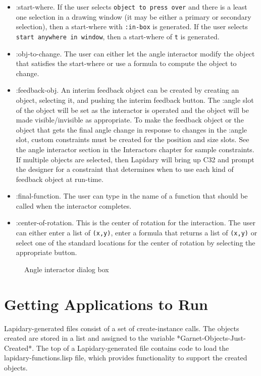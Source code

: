 \begin{itemize}
\item :start-where. If the user selects {\tt object to press over}
and there is a least one selection in a drawing
window (it may be either a primary or secondary selection), then a start-where
with {\tt :in-box} is generated. If the user selects {\tt start anywhere in
window}, then a start-where of {\tt t} is generated.

\item :obj-to-change. The user can either let the angle interactor modify the
object that satisfies the start-where or use a formula to compute the
object to change.

\item :feedback-obj. An interim feedback object can be created by creating
an object, selecting it,
and pushing the interim feedback button.
The :angle slot of the object will be
set as the interactor is operated and the object will be made visible/invisible
as appropriate.  To make the feedback object or the object that gets the final
angle change in response to changes in the :angle slot, custom constraints
must be created for the position and size slots.  See the angle interactor
section in the Interactors chapter for sample constraints.
If multiple objects are selected, then
Lapidary will bring up C32
and prompt the designer for a constraint that determines when to use each
kind of feedback object at run-time.

\item :final-function. The user can type in the name of a function that should
be called when the interactor completes.

\item :center-of-rotation. This is the center of rotation for the interaction.
The user can either enter a list of {\tt (x,y)}, enter a formula that
returns a list of {\tt (x,y)} or select one of the standard locations for
the center of rotation by selecting the appropriate button.

\end{itemize}

\begin{figure}
\begin{center}
\end{center}
\caption{Angle interactor dialog box}
\end{figure}


\chapter{Getting Applications to Run}

Lapidary-generated files consist of a set of create-instance
calls.  The objects created are stored in a list and assigned to
the variable *Garnet-Objects-Just-Created*.  The top of a Lapidary-generated
file contains code to load the lapidary-functions.lisp file, which
provides functionality to support the created objects.





